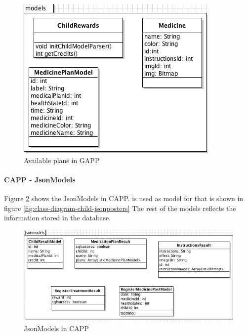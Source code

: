\begin{figure}
\begin{minipage}[b]{0.44\linewidth}
		\includegraphics[width=\linewidth]{Pictures/ArchPictures/capparchpictures/capp_models.png}
	\caption{Available plans in GAPP}
	\label{fig:capp-class-models}
	\end{minipage}
\end{figure}


\paragraph{CAPP - JsonModels}
Figure \ref{fig:class-diagram-child-jsonmodels} shows the JsonModels in CAPP.
 is used as model for  that is shown 
in figure \ref{fig:class-diagram-child-jsonposters}
The rest of the models reflects the information stored in the database.
\begin{figure}
	\centering
		\includegraphics[width = \linewidth]{Pictures/ArchPictures/capparchpictures/capp_jsonmodels.png}
	\caption{JsonModels in CAPP}
	\label{fig:class-diagram-child-jsonmodels}
\end{figure}

